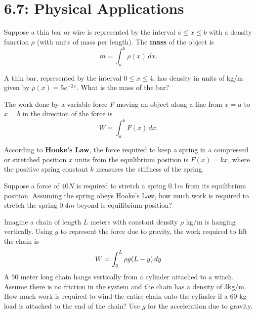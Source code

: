 \documentclass[../mathNotesPreamble]{subfiles}
\begin{document}
  \section{6.7: Physical Applications}

  \begin{defn*}
    Suppose a thin bar or wire is represented by the interval $a\leq x\leq b$ with a density function $\rho$ (with units of mass per length). The \textbf{mass} of the object is
      \[m=\int_a^b \rho(x)\,dx.\]
  \end{defn*}

  \begin{ex*}
    A thin bar, represented by the interval $0\leq x\leq 4$, has density in units of kg/m given by $\rho(x)=5e^{-2x}$. What is the mass of the bar?
  \end{ex*}
  \pagebreak

  \begin{defn*}[Work]
    The work done by a variable force $F$ moving an object along a line from $x=a$ to $x=b$ in the direction of the force is
      \[W=\int_a^b F(x)\,dx.\]
  \end{defn*}

  \begin{ex*}
    According to \textbf{Hooke's Law}, the force required to keep a spring in a compressed or stretched position $x$ units from the equilibrium position is $F(x)=kx$, where the positive spring constant $k$ measures the stiffness of the spring.
    \vspace*{\baselineskip}

    Suppose a force of $40 N$ is required to stretch a spring 0.1$m$ from its equilibrium position. Assuming the spring obeys Hooke's Law, how much work is required to stretch the spring 0.4$m$ beyond is equilibrium position? 
  \end{ex*}
  \pagebreak

  \begin{ex*}
    Imagine a chain of length $L$ meters with constant density $\rho$ kg/m is hanging vertically. Using $g$ to represent the force due to gravity, the work required to lift the chain is
      \[W=\int_0^L \rho g{\left(L-y\right)}\,dy\]
    A $50$ meter long chain hangs vertically from a cylinder attached to a winch. Assume there is no friction in the system and the chain has a density of $3$\nobreakspace kg/m. How much work is required to wind the entire chain onto the cylinder if a $60$-kg load is attached to the end of the chain? Use $g$ for the acceleration due to gravity.
  \end{ex*}
  \pagebreak
\end{document}
